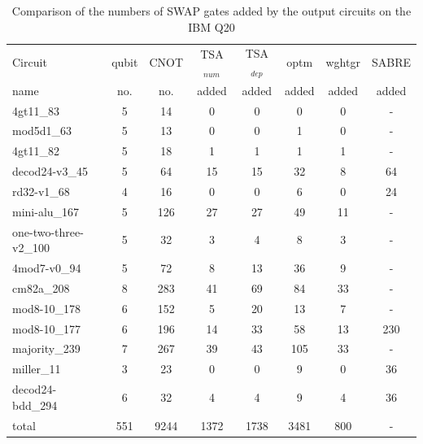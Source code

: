 \documentclass[runningheads]{llncs}
\begin{document}
		\begin{table}[!ht]
			\begin{center}  
			\begin{tabular}{|p{4.3cm}<{\centering}|c|c|c|c|c|c|c|}
			\hline
			Circuit &  qubit  & CNOT &TSA$_{num}$& TSA$_{dep}$  & optm 	 & wghtgr  &SABRE 	\\
			 name	&   no. 	&	no. & added&  added &  added 	&  added &  added\\
			\hline
			4gt11\_83 & 5 & 14 & 0 & 0 & 0 & 0& - \\
			mod5d1\_63 & 5 & 13 & 0 & 0 & 1 & 0& - \\
			4gt11\_82 & 5 & 18 & 1 & 1 & 1 & 1& - \\
			decod24-v3\_45 & 5 & 64 & 15 & 15 & 32 & 8& 64 \\
			rd32-v1\_68 & 4 & 16 & 0 & 0 & 6 & 0& 24 \\
			mini-alu\_167 & 5 & 126 & 27 & 27 & 49 & 11& - \\
			one-two-three-v2\_100 & 5 & 32 & 3 & 4 & 8 & 3& - \\
			4mod7-v0\_94 & 5 & 72 & 8 & 13 & 36 & 9& - \\
			cm82a\_208 & 8 & 283 & 41 & 69 & 84 & 33& - \\
			mod8-10\_178 & 6 & 152 & 5 & 20 & 13 & 7& - \\
			mod8-10\_177 & 6 & 196 & 14 & 33 & 58 & 13& 230 \\
			majority\_239 & 7 & 267 & 39 & 43 & 105 & 33& - \\
			miller\_11 & 3 & 23 & 0 & 0 & 9 & 0& 36 \\
			decod24-bdd\_294 & 6 & 32 & 4 & 4 & 9 & 4& 36 \\
			\hline
			total & 551 & 9244 & 1372 & 1738 & 3481 & 800 &-\\
			\hline
		\end{tabular} 
		\end{center}
		\caption{Comparison of  the numbers of SWAP gates added by the 
		output circuits on the IBM Q20 } 
		\label{tab4}
		\end{table}
		
\end{document}

